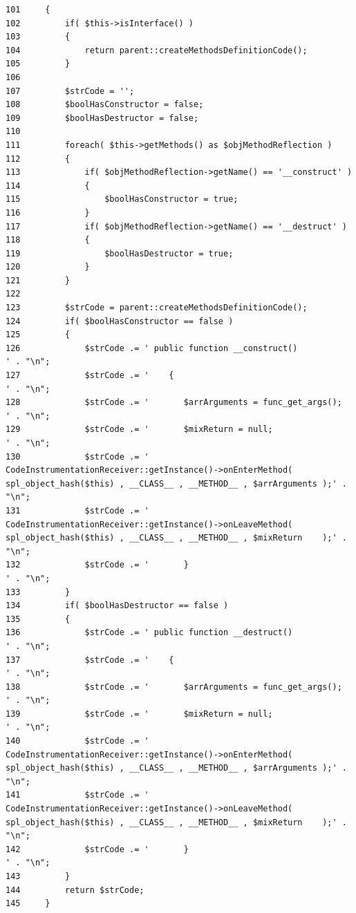 \begin{Code}\begin{verbatim}101     {
102         if( $this->isInterface() )
103         {
104             return parent::createMethodsDefinitionCode();
105         }
106         
107         $strCode = '';
108         $boolHasConstructor = false;
109         $boolHasDestructor = false;
110 
111         foreach( $this->getMethods() as $objMethodReflection )
112         {
113             if( $objMethodReflection->getName() == '__construct' )
114             {
115                 $boolHasConstructor = true;
116             }
117             if( $objMethodReflection->getName() == '__destruct' )
118             {
119                 $boolHasDestructor = true;
120             }
121         }
122 
123         $strCode = parent::createMethodsDefinitionCode();
124         if( $boolHasConstructor == false )
125         {
126             $strCode .= ' public function __construct()                                                                 ' . "\n";
127             $strCode .= '    {                                                                                          ' . "\n";
128             $strCode .= '       $arrArguments = func_get_args();                                                        ' . "\n";
129             $strCode .= '       $mixReturn = null;                                                                      ' . "\n";
130             $strCode .= '       CodeInstrumentationReceiver::getInstance()->onEnterMethod( spl_object_hash($this) , __CLASS__ , __METHOD__ , $arrArguments );' . "\n";
131             $strCode .= '       CodeInstrumentationReceiver::getInstance()->onLeaveMethod( spl_object_hash($this) , __CLASS__ , __METHOD__ , $mixReturn    );' . "\n";
132             $strCode .= '       }                                                                                           ' . "\n";
133         }
134         if( $boolHasDestructor == false )
135         {
136             $strCode .= ' public function __destruct()                                                                 ' . "\n";
137             $strCode .= '    {                                                                                          ' . "\n";
138             $strCode .= '       $arrArguments = func_get_args();                                                        ' . "\n";
139             $strCode .= '       $mixReturn = null;                                                                      ' . "\n";
140             $strCode .= '       CodeInstrumentationReceiver::getInstance()->onEnterMethod( spl_object_hash($this) , __CLASS__ , __METHOD__ , $arrArguments );' . "\n";
141             $strCode .= '       CodeInstrumentationReceiver::getInstance()->onLeaveMethod( spl_object_hash($this) , __CLASS__ , __METHOD__ , $mixReturn    );' . "\n";
142             $strCode .= '       }                                                                                           ' . "\n";
143         }
144         return $strCode;
145     }
\end{verbatim}
\end{Code}


